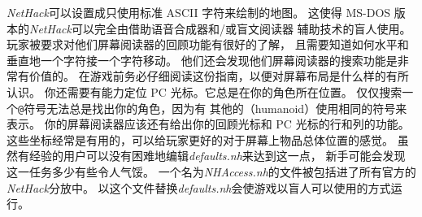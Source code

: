 \documentclass[a4paper, 10pt]{article}
\begin{document}
{\it NetHack}可以设置成只使用标准 ASCII 字符来绘制\zhTransDungeon{}的地图。
这使得 MS-DOS 版本的{\it NetHack}可以完全由借助语音合成器和/或盲文阅读器
辅助技术的盲人使用。
玩家被要求对他们屏幕阅读器的回顾功能有很好的了解，
且需要知道如何水平和垂直地一个字符接一个字符移动。
他们还会发现他们屏幕阅读器的搜索功能是非常有价值的。
在游戏前务必仔细阅读这份指南，以便对屏幕布局是什么样的有所认识。
你还需要有能力定位 PC 光标。它总是在你的角色所在位置。
仅仅搜索一个{\tt @}符号无法总是找出你的角色，因为有
其他的\zhTransHumanoid（humanoid）使用相同的符号来表示。
你的屏幕阅读器应该还有给出你的回顾光标和 PC 光标的行和列的功能。
这些坐标经常是有用的，可以给玩家更好的对于屏幕上物品总体位置的感觉。
虽然有经验的用户可以没有困难地编辑{\it defaults.nh\/}来达到这一点，
新手可能会发现这一任务多少有些令人气馁。
一个名为{\it NHAccess.nh\/}的文件被包括进了所有官方的{\it NetHack}分放中。
以这个文件替换{\it defaults.nh\/}会使游戏以盲人可以使用的方式运行。
\end{document}
